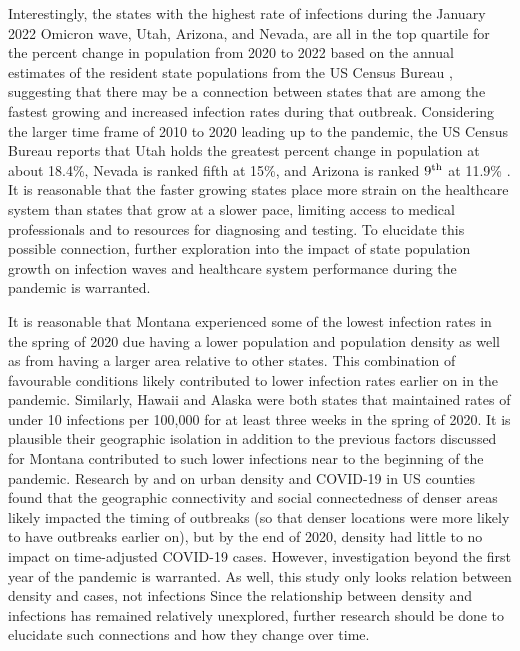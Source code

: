 \documentclass{article}
\begin{document}
Interestingly, the states with the highest rate of infections during the January
2022 Omicron wave, Utah, Arizona, and Nevada, are all in the top quartile for
the percent change in population from 2020 to 2022 based on the annual estimates
of the resident state populations from the US Census Bureau
\citep{uscensus2022annual}, suggesting that there may be a connection between
states that are among the fastest growing and increased infection rates during
that outbreak. Considering the larger time frame of 2010 to 2020 leading up to
the pandemic, the US Census Bureau reports that Utah holds the greatest percent
change in population at about 18.4\%, Nevada is ranked fifth at 15\%, and
Arizona is ranked $9^{\textnormal{th}}$ at 11.9\% \citep{censusbureau2020}. It is reasonable
that the faster growing states place more strain on the healthcare system than
states that grow at a slower pace, limiting access to medical professionals and
to resources for diagnosing and testing. To elucidate this possible connection,
further exploration into the impact of state population growth on infection
waves and healthcare system performance during the pandemic is warranted.

It is reasonable that Montana experienced some of the lowest infection
rates in the spring of 2020 due having a lower population and population density 
as well as from having a larger area relative to other states. This combination of favourable
conditions likely contributed to lower infection rates earlier on in the pandemic.
Similarly, Hawaii and Alaska were both states that maintained rates of under 
10 infections per 100,000 for at least three weeks in the spring of 2020. It is 
plausible their geographic isolation in addition to the previous factors discussed for
Montana contributed to such lower infections near to the beginning of the pandemic.
Research by \citet{provenzano2020urban} and \citet{carozzi2022urban} on urban density and COVID-19 
in US counties found that the geographic connectivity and social connectedness of denser areas 
likely impacted the timing of outbreaks (so that denser locations were more likely to 
have outbreaks earlier on), but by the end of 2020, density had little to no impact on time-adjusted 
 COVID-19 cases.
 However, investigation beyond the first year of the pandemic is warranted.
 As well, this study only looks relation between density and cases, not infections 
 Since the relationship between density and infections has remained relatively unexplored, 
 further research should be done to elucidate such connections and how they change over time.
\end{document}
